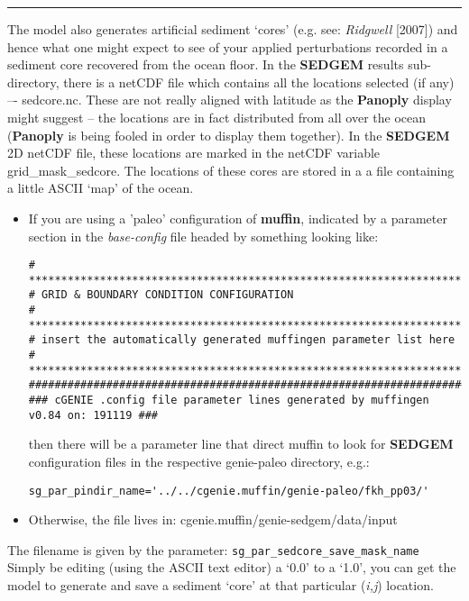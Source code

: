 \documentclass[11pt,fleqn]{book} %
\begin{document}
\vspace{1mm}
\noindent\rule{4cm}{0.1mm}
\vspace{2mm}

\noindent The model also generates artificial sediment ‘cores’ (e.g. see: \textit{Ridgwell} [2007]) and hence what one might expect to see of your applied perturbations recorded in a sediment core recovered from the ocean floor. In the \textbf{SEDGEM} results sub-directory, there is a netCDF file which contains all the locations selected (if any) –- \textsf{\footnotesize sedcore.nc}. These are not really aligned with latitude as the \textbf{Panoply} display might suggest – the locations are in fact distributed from all over the ocean (\textbf{Panoply} is being fooled in order to display them together). In the \textbf{SEDGEM} 2D netCDF file, these locations are marked in the netCDF variable \textsf{\footnotesize grid\_mask\_sedcore}. The locations of these cores are stored in a a file containing a little ASCII ‘map’ of the ocean.

\begin{itemize}[noitemsep]
\vspace{1mm}
\item
If you are using a 'paleo' configuration of \textbf{muffin}, indicated by a parameter section in the \textit{base-config} file headed by something looking like:
\footnotesize\begin{verbatim}
# *******************************************************************
# GRID & BOUNDARY CONDITION CONFIGURATION
# *******************************************************************
# insert the automatically generated muffingen parameter list here
# *******************************************************************
###################################################################################
### cGENIE .config file parameter lines generated by muffingen v0.84 on: 191119 ###
\end{verbatim}\normalsize
then there will be a parameter line that direct muffin to look for \textbf{SEDGEM} configuration files in the respective \textsf{\footnotesize genie-paleo } directory, e.g.:
\vspace{-1mm}\small\begin{verbatim}
sg_par_pindir_name='../../cgenie.muffin/genie-paleo/fkh_pp03/'
\end{verbatim}\normalsize\vspace{-1mm}
\vspace{1mm}
\item Otherwise, the file lives in: \textsf{\footnotesize cgenie.muffin/genie-sedgem/data/input}
\end{itemize}
\vspace{1mm}
The filename is given by the parameter: \texttt{sg\_par\_sedcore\_save\_mask\_name}
\\Simply be editing (using the ASCII text editor) a ‘0.0’ to a ‘1.0’, you can get the model to generate and save a sediment ‘core’ at that particular (\textit{i,j}) location.
\end{document}
